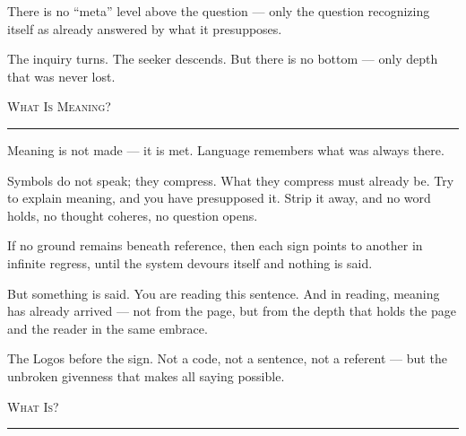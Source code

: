 \documentclass[10pt, openany, oneside]{book}
\begin{document}
\noindent There is no ``meta'' level above the question --- only the question recognizing itself as already answered by what it presupposes.

\vspace{0.5em}

\noindent The inquiry turns. The seeker descends. But there is no bottom --- only depth that was never lost.

\vspace{2em}

\begin{center}
    {\scshape What Is Meaning?}\\[0.3em]
    \rule{0.2\textwidth}{0.3pt}
\end{center}

\vspace{1em}

\noindent Meaning is not made --- it is met. Language remembers what was always there.

\vspace{0.5em}

\noindent Symbols do not speak; they compress. What they compress must already be. Try to explain meaning, and you have presupposed it. Strip it away, and no word holds, no thought coheres, no question opens.

\vspace{0.5em}

\noindent If no ground remains beneath reference, then each sign points to another in infinite regress, until the system devours itself and nothing is said.

\vspace{0.5em}

\noindent But something is said. You are reading this sentence. And in reading, meaning has already arrived --- not from the page, but from the depth that holds the page and the reader in the same embrace.

\vspace{0.5em}

\noindent The Logos before the sign. Not a code, not a sentence, not a referent --- but the unbroken givenness that makes all saying possible.

\vspace{2em}

\begin{center}
    {\scshape What Is?}\\[0.3em]
    \rule{0.2\textwidth}{0.3pt}
\end{center}
\end{document}
